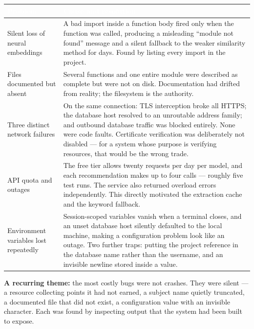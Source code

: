 \documentclass[11pt,a4paper]{article}
\newcommand{\thead}[1]{\textcolor{white}{\bfseries\small #1}}
\newcommand{\headrow}{\rowcolor{navy}}
\begin{document}
\vspace{4pt}
\begin{tabularx}{\textwidth}{>{\raggedright\arraybackslash}p{4cm} >{\raggedright\arraybackslash}X}
\headrow \thead{Problem} & \thead{Cause and resolution} \\
\midrule
Silent loss of neural embeddings & A bad import inside a function body fired only when the function was called, producing a misleading ``module not found'' message and a silent fallback to the weaker similarity method for days. Found by listing every import in the project. \\
\rowcolor{altshade} Files documented but absent & Several functions and one entire module were described as complete but were not on disk. Documentation had drifted from reality; the filesystem is the authority. \\
Three distinct network failures & On the same connection: TLS interception broke all HTTPS; the database host resolved to an unroutable address family; and outbound database traffic was blocked entirely. None were code faults. Certificate verification was deliberately not disabled --- for a system whose purpose is verifying resources, that would be the wrong trade. \\
\rowcolor{altshade} API quota and outages & The free tier allows twenty requests per day per model, and each recommendation makes up to four calls --- roughly five test runs. The service also returned overload errors independently. This directly motivated the extraction cache and the keyword fallback. \\
Environment variables lost repeatedly & Session-scoped variables vanish when a terminal closes, and an unset database host silently defaulted to the local machine, making a configuration problem look like an outage. Two further traps: putting the project reference in the database name rather than the username, and an invisible newline stored inside a value. \\
\bottomrule
\end{tabularx}
\vspace{8pt}

\textbf{A recurring theme:} the most costly bugs were not crashes. They were
silent --- a resource collecting points it had not earned, a subject name
quietly truncated, a documented file that did not exist, a configuration value
with an invisible character. Each was found by inspecting output that the
system had been built to expose.

\newpage
\end{document}
